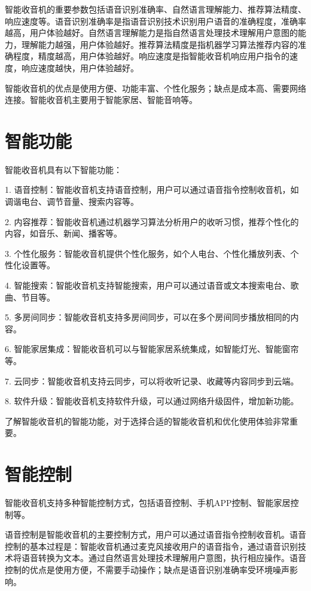 \documentclass[12pt,UTF8]{ctexbook}
\begin{document}
智能收音机的重要参数包括语音识别准确率、自然语言理解能力、推荐算法精度、响应速度等。语音识别准确率是指语音识别技术识别用户语音的准确程度，准确率越高，用户体验越好。自然语言理解能力是指自然语言处理技术理解用户意图的能力，理解能力越强，用户体验越好。推荐算法精度是指机器学习算法推荐内容的准确程度，精度越高，用户体验越好。响应速度是指智能收音机响应用户指令的速度，响应速度越快，用户体验越好。

智能收音机的优点是使用方便、功能丰富、个性化服务；缺点是成本高、需要网络连接。智能收音机主要用于智能家居、智能音响等。

\section{智能功能}

智能收音机具有以下智能功能：

1. 语音控制：智能收音机支持语音控制，用户可以通过语音指令控制收音机，如调谐电台、调节音量、搜索内容等。

2. 内容推荐：智能收音机通过机器学习算法分析用户的收听习惯，推荐个性化的内容，如音乐、新闻、播客等。

3. 个性化服务：智能收音机提供个性化服务，如个人电台、个性化播放列表、个性化设置等。

4. 智能搜索：智能收音机支持智能搜索，用户可以通过语音或文本搜索电台、歌曲、节目等。

5. 多房间同步：智能收音机支持多房间同步，可以在多个房间同步播放相同的内容。

6. 智能家居集成：智能收音机可以与智能家居系统集成，如智能灯光、智能窗帘等。

7. 云同步：智能收音机支持云同步，可以将收听记录、收藏等内容同步到云端。

8. 软件升级：智能收音机支持软件升级，可以通过网络升级固件，增加新功能。

了解智能收音机的智能功能，对于选择合适的智能收音机和优化使用体验非常重要。

\section{智能控制}

智能收音机支持多种智能控制方式，包括语音控制、手机APP控制、智能家居控制等。

语音控制是智能收音机的主要控制方式，用户可以通过语音指令控制收音机。语音控制的基本过程是：智能收音机通过麦克风接收用户的语音指令，通过语音识别技术将语音转换为文本。通过自然语言处理技术理解用户意图，执行相应操作。语音控制的优点是使用方便，不需要手动操作；缺点是语音识别准确率受环境噪声影响。
\end{document}
